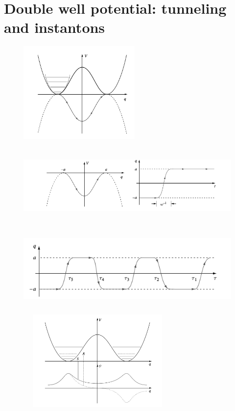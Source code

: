 \documentclass[a4paper, 12pt]{article}
\begin{document}
\section {Double well potential: tunneling and instantons}
\begin{figure}[ht]
    \centering
    \includegraphics[height=5cm, width=6cm]{fig1}
\end{figure}










\begin{figure}[ht]
    \centering
    \includegraphics[height=4cm, width=15cm]{fig2}
\end{figure}
\begin{figure}[ht]
    \centering
    \includegraphics[height=4cm, width=15cm]{fig3}
\end{figure}
\begin{figure}[ht]
    \centering
    \includegraphics[height=5cm, width=8cm]{fig4}
\end{figure}
\end{document}
